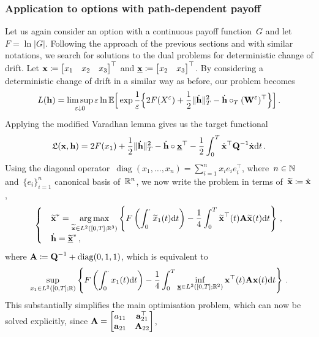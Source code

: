 \subsubsection{\textbf{Application to options with path-dependent payoff}}
Let us again consider an option with a continuous payoff function~$G$ and let~${F=\ln|G|}$. Following the approach of the previous sections and with similar notations, we search for solutions to the dual problems for deterministic change of drift.
Let 
$\boldsymbol{\mathrm{x}} \coloneqq \begin{bmatrix}x_1& x_2& x_3\end{bmatrix}^\top$ and 
$\underline{\boldsymbol{\mathrm{x}}}\coloneqq \begin{bmatrix}x_2 &  x_3\end{bmatrix}^\top$. 
By considering a deterministic change of drift in a similar way as before, our problem becomes 
\[
L(\boldsymbol{\mathrm{h}}) = \limsup\limits_{\varepsilon \downarrow 0} \varepsilon\ln\mathbb{E}\Big[\exp\frac{1}{\varepsilon}\Big\{
2F(X^\varepsilon) +\frac{1}{2}\|\dot{\boldsymbol{\mathrm{h}}}\|^2_T - \dot{\boldsymbol{\mathrm{h}}}\circ_{T}({\boldsymbol{\mathrm{W}}^\varepsilon})^\top\Big\}\Big]\,.
\]
Applying the modified Varadhan lemma gives us the 
target functional
$$
\mathfrak{L}(\boldsymbol{\mathrm{x}},\boldsymbol{\mathrm{h}}) = 2F(x_1) + \frac{1}{2}\|\dot{\boldsymbol{\mathrm{h}}}\|^2_T - \dot{\boldsymbol{\mathrm{h}}}\circ\underline{\boldsymbol{\mathrm{x}}}^\top - \frac{1}{2}\int_0^T\dot{\boldsymbol{\mathrm{x}}}^\top \boldsymbol{\mathrm{Q}}^{-1} \dot{\boldsymbol{\mathrm{x}}} \mathrm{d} t\,.
$$
Using the diagonal operator~$\operatorname{diag}(x_1,\dots,x_n)=\sum_{i=1}^n x_i e_i e_i^\top$, where~$n\in\mathbb{N}$ and~$\{e_i\}_{i=1}^n$ canonical basis of~$\mathbb{R}^n$, we now write the problem in terms of~$\widetilde{\boldsymbol{\mathrm{x}}}\coloneqq\dot{\boldsymbol{\mathrm{x}}}\,$,
$$
\begin{cases}
& \displaystyle \widetilde{\boldsymbol{\mathrm{x}}}^{*}  =  \operatorname*{arg\,max}\limits_{\widetilde{\boldsymbol{\mathrm{x}}} \in L^2([0,T]; \mathbb{R}^3)}
\left\{F\left(\int_0^\cdot \widetilde x_1(t) \mathrm{d} t\right) - \frac{1}{4}\int_0^T \widetilde{\boldsymbol{\mathrm{x}}}^\top(t) 
\boldsymbol{\mathrm{A}}\widetilde{\boldsymbol{\mathrm{x}}}(t) \mathrm{d} t\right\}\,, \\
& \displaystyle \dot{\boldsymbol{\mathrm{h}}} = \widetilde{\underline{\boldsymbol{\mathrm{x}}}}^{*}\,,
\end{cases}
$$
where 
$\boldsymbol{\mathrm{A}} \coloneqq \boldsymbol{\mathrm{Q}}^{-1} + \operatorname{diag}(0,1,1)$, 
which is equivalent to
\begin{equation}\label{eq:SupInfInt}
\sup\limits_{x_1\in L^2([0,T]; \mathbb{R})}\left \{F\left(\int_0^\cdot x_1(t) \mathrm{d} t\right) - \frac{1}{4}\int_0^T \inf_{\underline{\boldsymbol{\mathrm{x}}}\in L^2([0,T]; \mathbb{R}^2)} \boldsymbol{\mathrm{x}}^\top(t) \boldsymbol{\mathrm{A}}\boldsymbol{\mathrm{x}}(t) \mathrm{d} t \right \}\,.
\end{equation}
This substantially simplifies the main optimisation problem, which can now be solved explicitly, since 
$
\boldsymbol{\mathrm{A}} =
\begin{bmatrix}
a_{11} & \boldsymbol{\mathrm{a}}_{21}^\top\\
\boldsymbol{\mathrm{a}}_{21} &\boldsymbol{\mathrm{A}}_{22}\\
\end{bmatrix}$,
